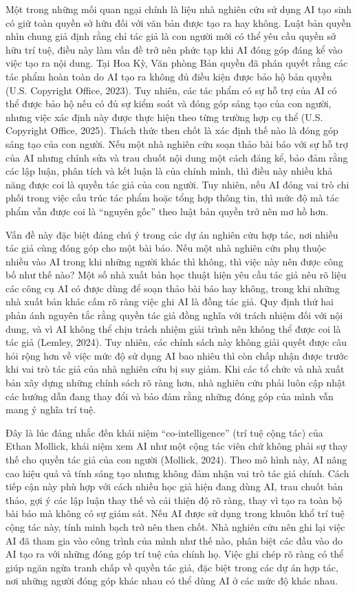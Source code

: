 Một trong những mối quan ngại chính là liệu nhà nghiên cứu sử dụng AI tạo sinh có giữ toàn quyền sở hữu đối với văn bản được tạo ra hay không. Luật bản quyền nhìn chung giả định rằng chỉ tác giả là con người mới có thể yêu cầu quyền sở hữu trí tuệ, điều này làm vấn đề trở nên phức tạp khi AI đóng góp đáng kể vào việc tạo ra nội dung. Tại Hoa Kỳ, Văn phòng Bản quyền đã phán quyết rằng các tác phẩm hoàn toàn do AI tạo ra không đủ điều kiện được bảo hộ bản quyền (U.S. Copyright Office, 2023). Tuy nhiên, các tác phẩm có sự hỗ trợ của AI có thể được bảo hộ nếu có đủ sự kiểm soát và đóng góp sáng tạo của con người, nhưng việc xác định này được thực hiện theo từng trường hợp cụ thể (U.S. Copyright Office, 2025). Thách thức then chốt là xác định thế nào là đóng góp sáng tạo của con người. Nếu một nhà nghiên cứu soạn thảo bài báo với sự hỗ trợ của AI nhưng chỉnh sửa và trau chuốt nội dung một cách đáng kể, bảo đảm rằng các lập luận, phân tích và kết luận là của chính mình, thì điều này nhiều khả năng được coi là quyền tác giả của con người. Tuy nhiên, nếu AI đóng vai trò chi phối trong việc cấu trúc tác phẩm hoặc tổng hợp thông tin, thì mức độ mà tác phẩm vẫn được coi là ``nguyên gốc'' theo luật bản quyền trở nên mơ hồ hơn.

Vấn đề này đặc biệt đáng chú ý trong các dự án nghiên cứu hợp tác, nơi nhiều tác giả cùng đóng góp cho một bài báo. Nếu một nhà nghiên cứu phụ thuộc nhiều vào AI trong khi những người khác thì không, thì việc này nên được công bố như thế nào? Một số nhà xuất bản học thuật hiện yêu cầu tác giả nêu rõ liệu các công cụ AI có được dùng để soạn thảo bài báo hay không, trong khi những nhà xuất bản khác cấm rõ ràng việc ghi AI là đồng tác giả. Quy định thứ hai phản ánh nguyên tắc rằng quyền tác giả đồng nghĩa với trách nhiệm đối với nội dung, và vì AI không thể chịu trách nhiệm giải trình nên không thể được coi là tác giả (Lemley, 2024). Tuy nhiên, các chính sách này không giải quyết được câu hỏi rộng hơn về việc mức độ sử dụng AI bao nhiêu thì còn chấp nhận được trước khi vai trò tác giả của nhà nghiên cứu bị suy giảm. Khi các tổ chức và nhà xuất bản xây dựng những chính sách rõ ràng hơn, nhà nghiên cứu phải luôn cập nhật các hướng dẫn đang thay đổi và bảo đảm rằng những đóng góp của mình vẫn mang ý nghĩa trí tuệ.

Đây là lúc đáng nhắc đến khái niệm ``co-intelligence'' (trí tuệ cộng tác) của Ethan Mollick, khái niệm xem AI như một cộng tác viên chứ không phải sự thay thế cho quyền tác giả của con người (Mollick, 2024). Theo mô hình này, AI nâng cao hiệu quả và tính sáng tạo nhưng không đảm nhận vai trò tác giả chính. Cách tiếp cận này phù hợp với cách nhiều học giả hiện đang dùng AI, trau chuốt bản thảo, gợi ý các lập luận thay thế và cải thiện độ rõ ràng, thay vì tạo ra toàn bộ bài báo mà không có sự giám sát. Nếu AI được sử dụng trong khuôn khổ trí tuệ cộng tác này, tính minh bạch trở nên then chốt. Nhà nghiên cứu nên ghi lại việc AI đã tham gia vào công trình của mình như thế nào, phân biệt các đầu vào do AI tạo ra với những đóng góp trí tuệ của chính họ. Việc ghi chép rõ ràng có thể giúp ngăn ngừa tranh chấp về quyền tác giả, đặc biệt trong các dự án hợp tác, nơi những người đóng góp khác nhau có thể dùng AI ở các mức độ khác nhau.

